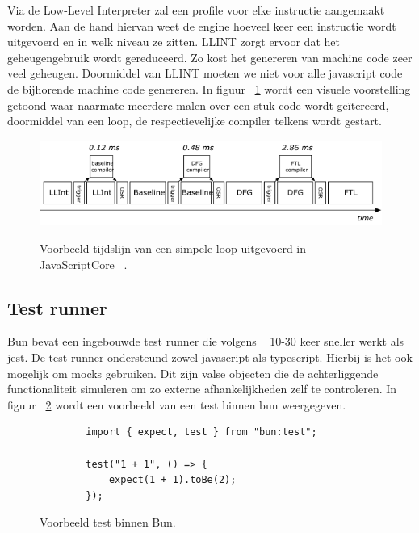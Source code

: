 Via de Low-Level Interpreter zal een profile voor elke instructie aangemaakt worden. 
Aan de hand hiervan weet de engine hoeveel keer een instructie wordt uitgevoerd en in welk niveau ze zitten.
LLINT zorgt ervoor dat het geheugengebruik wordt gereduceerd. Zo kost het genereren van machine code zeer veel geheugen.
Doormiddel van LLINT moeten we niet voor alle javascript code de bijhorende machine code genereren.
In figuur ~\ref{fig:javascriptcore} wordt een visuele voorstelling getoond 
waar naarmate meerdere malen over een stuk code wordt geïtereerd, doormiddel van een loop, de respectievelijke compiler telkens wordt gestart.
\begin{figure}[H]
    \centering
    \includegraphics[width=.9\textwidth]{graphics/javascriptcore.png}
    \caption{\label{fig:javascriptcore}}Voorbeeld tijdslijn van een simpele loop uitgevoerd in JavaScriptCore ~\autocite{Pizlo2020}.
\end{figure}


\subsection{Test runner}
Bun bevat een ingebouwde test runner die volgens ~\textcite{McDonnel2023} 10-30 keer sneller werkt als jest.
De test runner ondersteund zowel javascript als typescript. Hierbij is het ook mogelijk om mocks gebruiken.
Dit zijn valse objecten die de achterliggende functionaliteit simuleren om zo externe afhankelijkheden zelf te controleren.
In figuur ~\ref{fig:testbun} wordt een voorbeeld van een test binnen bun weergegeven.
\begin{figure}[H]
    \centering
    \begin{verbatim}
        import { expect, test } from "bun:test";

        test("1 + 1", () => {
            expect(1 + 1).toBe(2);
        });
        \end{verbatim}
        \caption{\label{fig:testbun}}Voorbeeld test binnen Bun.
\end{figure}